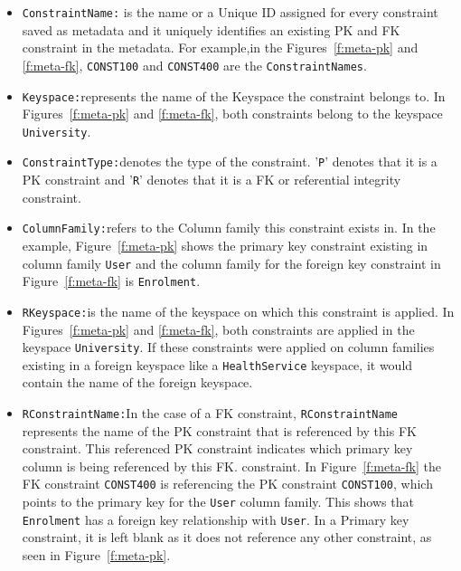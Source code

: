 \begin{itemize}
  
  \item \texttt{ConstraintName:} is the name or a  Unique ID assigned for every
  constraint saved as metadata and it uniquely identifies an
  existing \ac{PK} and \ac{FK} constraint in the metadata. 
  For example,in the Figures~\ref{f:meta-pk} and
  \ref{f:meta-fk}, \texttt{CONST100} and \texttt{CONST400} are the \texttt{ConstraintNames}. 
    
  
  \item \texttt{Keyspace:}represents the name of the Keyspace the constraint
  belongs to. 
  In Figures~\ref{f:meta-pk} and \ref{f:meta-fk}, both constraints belong to the
  keyspace \texttt{University}. 
  
  \item \texttt{ConstraintType:}denotes the type of the constraint.  '\texttt{P}'
  denotes that it is a \ac{PK} constraint and '\texttt{R}' denotes that it is a
   \ac{FK} or referential integrity constraint. 
   
 
  
  \item \texttt{ColumnFamily:}refers to the Column family this constraint
  exists in. 
  In the example,  Figure~\ref{f:meta-pk} shows the primary key constraint
  existing in column family \texttt{User} and the column family for the foreign
  key constraint in Figure~\ref{f:meta-fk} is \texttt{Enrolment}. 
  
  \item \texttt{RKeyspace:}is the name of the keyspace on which this constraint
  is applied.  In Figures~\ref{f:meta-pk} and \ref{f:meta-fk}, both constraints
  are applied in  the keyspace \texttt{University}.  If these constraints were
  applied on column families existing in a foreign keyspace like a
  \texttt{HealthService} keyspace, it would contain the name of the foreign
  keyspace. 
  
  \item \texttt{RConstraintName:}In the case of a \ac{FK}
  constraint, \texttt{RConstraintName} represents the name of the \ac{PK}
  constraint that is referenced by this \ac{FK} constraint.  This referenced
  \ac{PK} constraint indicates which primary key column  is being referenced
  by this \ac{FK}.  constraint.  In Figure~\ref{f:meta-fk}  the \ac{FK}
  constraint \texttt{CONST400} is referencing the
  \ac{PK} constraint 
  \texttt{CONST100}, which points to the primary key for the \texttt{User}
  column family.  This shows that \texttt{Enrolment} has a foreign key
  relationship with \texttt{User}.  In a Primary key constraint, it is left blank
  as it does not reference any other constraint, as seen in Figure~\ref{f:meta-pk}. 
  

\end{itemize}
